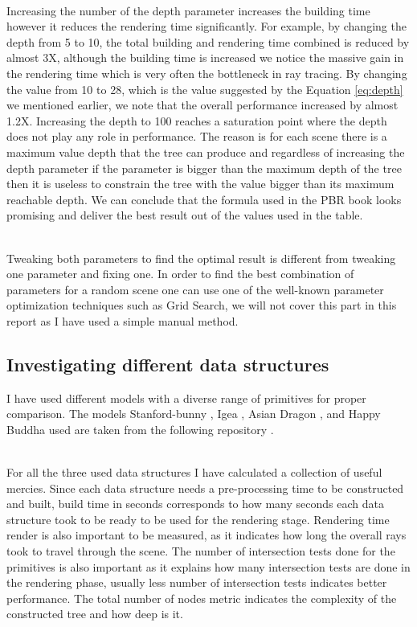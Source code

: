 \documentclass[11pt,a4paper]{article}
\begin{document}
\noindent
\\
Increasing the number of the depth parameter increases the building time however it reduces the rendering time significantly. For example, by changing the depth from 5 to 10, the total building and rendering time combined is reduced by almost 3X, although the building time is increased we notice the massive gain in the rendering time which is very often the bottleneck in ray tracing. By changing the value from 10 to 28, which is the value suggested by the Equation \eqref{eq:depth} we mentioned earlier, we note that the overall performance increased by almost 1.2X. Increasing the depth to 100 reaches a saturation point where the depth does not play any role in performance. The reason is for each scene there is a maximum value depth that the tree can produce and regardless of increasing the depth parameter if the parameter is bigger than the maximum depth of the tree then it is useless to constrain the tree with the value bigger than its maximum reachable depth.  We can conclude that the formula used in the PBR book looks promising and deliver the best result out of the values used in the table. 

\noindent
\\
Tweaking both parameters to find the optimal result is different from tweaking one parameter and fixing one. In order to find the best combination of parameters for a random scene one can use one of the well-known parameter optimization techniques such as  Grid Search, we will not cover this part in this report as I have used a simple manual method. 

\subsection{Investigating different data structures}
I have used different models with a diverse range of primitives for proper comparison. The models Stanford-bunny \protect\cite{stanfordbunny}, Igea \protect\cite{igea}, Asian Dragon \protect\cite{stanfordxyzdragon}, and Happy Buddha \protect\cite{buddha} used are taken from the following repository \protect\cite{Jacobson2021}.

\noindent
\\
For all the three used data structures I have calculated a collection of useful mercies.  Since each data structure needs a pre-processing time to be constructed and built, build time in seconds corresponds to how many seconds each data structure took to be ready to be used for the rendering stage. Rendering time render is also important to be measured, as it indicates how long the overall rays took to travel through the scene. The number of intersection tests done for the primitives is also important as it explains how many intersection tests are done in the rendering phase, usually less number of intersection tests indicates better performance. The total number of nodes metric indicates the complexity of the constructed tree and how deep is it. 
\end{document}
